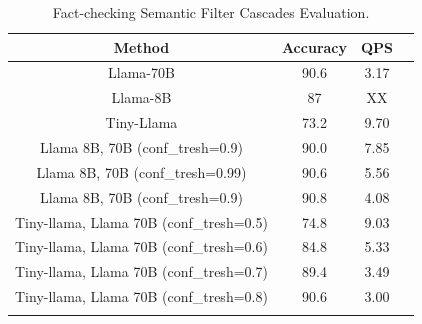 \begin{table}[h]

\centering
\caption{Fact-checking Semantic Filter Cascades Evaluation. }
\vspace{-.3cm}
\begin{tabular}{cccc}
\toprule
Method & Accuracy & QPS \\
\midrule
Llama-70B & 90.6 & 3.17 \\
Llama-8B & 87 & XX \\
Tiny-Llama & 73.2 & 9.70 \\
Llama 8B, 70B (conf\_tresh=0.9)  & 90.0 & 7.85 \\
Llama 8B, 70B (conf\_tresh=0.99)  & 90.6 & 5.56\\
Llama 8B, 70B (conf\_tresh=0.9)  & 90.8 & 4.08 \\
Tiny-llama, Llama 70B (conf\_tresh=0.5)  & 74.8 & 9.03 \\
Tiny-llama, Llama 70B (conf\_tresh=0.6)  & 84.8 & 5.33\\
Tiny-llama, Llama 70B (conf\_tresh=0.7)  & 89.4 & 3.49 \\
Tiny-llama, Llama 70B (conf\_tresh=0.8)  & 90.6 & 3.00 \\

\bottomrule
\label{tab:filtercascades}

\end{tabular}

\end{table}
